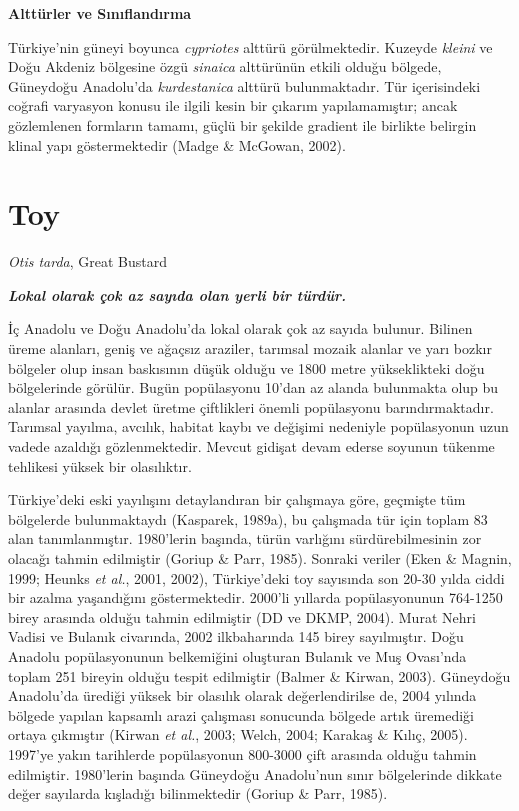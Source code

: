 \documentclass[
  a4paper,
  DIV=11,
  numbers=noendperiod]{scrreprt}
\begin{document}
\textbf{Alttürler ve Sınıflandırma}

Türkiye'nin güneyi boyunca \emph{cypriotes} alttürü görülmektedir.
Kuzeyde \emph{kleini} ve Doğu Akdeniz bölgesine özgü \emph{sinaica}
alttürünün etkili olduğu bölgede, Güneydoğu Anadolu'da
\emph{kurdestanica} alttürü bulunmaktadır. Tür içerisindeki coğrafi
varyasyon konusu ile ilgili kesin bir çıkarım yapılamamıştır; ancak
gözlemlenen formların tamamı, güçlü bir şekilde gradient ile birlikte
belirgin klinal yapı göstermektedir (Madge \& McGowan, 2002).

\section{Toy}\label{toy}

\emph{Otis tarda}, Great Bustard

\textbf{\emph{Lokal olarak çok az sayıda olan yerli bir türdür.}}

İç Anadolu ve Doğu Anadolu'da lokal olarak çok az sayıda bulunur.
Bilinen üreme alanları, geniş ve ağaçsız araziler, tarımsal mozaik
alanlar ve yarı bozkır bölgeler olup insan baskısının düşük olduğu ve
1800 metre yükseklikteki doğu bölgelerinde görülür. Bugün popülasyonu
10'dan az alanda bulunmakta olup bu alanlar arasında devlet üretme
çiftlikleri önemli popülasyonu barındırmaktadır. Tarımsal yayılma,
avcılık, habitat kaybı ve değişimi nedeniyle popülasyonun uzun vadede
azaldığı gözlenmektedir. Mevcut gidişat devam ederse soyunun tükenme
tehlikesi yüksek bir olasılıktır.

Türkiye'deki eski yayılışını detaylandıran bir çalışmaya göre, geçmişte
tüm bölgelerde bulunmaktaydı (Kasparek, 1989a), bu çalışmada tür için
toplam 83 alan tanımlanmıştır. 1980'lerin başında, türün varlığını
sürdürebilmesinin zor olacağı tahmin edilmiştir (Goriup \& Parr, 1985).
Sonraki veriler (Eken \& Magnin, 1999; Heunks \emph{et al.}, 2001,
2002), Türkiye'deki toy sayısında son 20-30 yılda ciddi bir azalma
yaşandığını göstermektedir. 2000'li yıllarda popülasyonunun 764-1250
birey arasında olduğu tahmin edilmiştir (DD ve DKMP, 2004). Murat Nehri
Vadisi ve Bulanık civarında, 2002 ilkbaharında 145 birey sayılmıştır.
Doğu Anadolu popülasyonunun belkemiğini oluşturan Bulanık ve Muş
Ovası'nda toplam 251 bireyin olduğu tespit edilmiştir (Balmer \& Kirwan,
2003). Güneydoğu Anadolu'da ürediği yüksek bir olasılık olarak
değerlendirilse de, 2004 yılında bölgede yapılan kapsamlı arazi
çalışması sonucunda bölgede artık üremediği ortaya çıkmıştır (Kirwan
\emph{et al.}, 2003; Welch, 2004; Karakaş \& Kılıç, 2005). 1997'ye yakın
tarihlerde popülasyonun 800-3000 çift arasında olduğu tahmin edilmiştir.
1980'lerin başında Güneydoğu Anadolu'nun sınır bölgelerinde dikkate
değer sayılarda kışladığı bilinmektedir (Goriup \& Parr, 1985).
\end{document}

